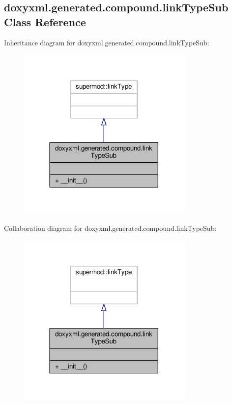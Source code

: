 \subsection{doxyxml.\+generated.\+compound.\+link\+Type\+Sub Class Reference}
\label{classdoxyxml_1_1generated_1_1compound_1_1linkTypeSub}


Inheritance diagram for doxyxml.\+generated.\+compound.\+link\+Type\+Sub\+:
\nopagebreak
\begin{figure}[H]
\begin{center}
\leavevmode
\includegraphics[width=245pt]{d8/d6a/classdoxyxml_1_1generated_1_1compound_1_1linkTypeSub__inherit__graph}
\end{center}
\end{figure}


Collaboration diagram for doxyxml.\+generated.\+compound.\+link\+Type\+Sub\+:
\nopagebreak
\begin{figure}[H]
\begin{center}
\leavevmode
\includegraphics[width=245pt]{d0/de8/classdoxyxml_1_1generated_1_1compound_1_1linkTypeSub__coll__graph}
\end{center}
\end{figure}

